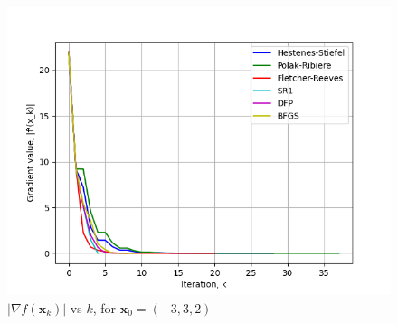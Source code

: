\documentclass[a4paper]{article}
\begin{document}
\begin{figure}[H]
    \centering
    \includegraphics[width=.65\textwidth]{hyperellipsoid_function_grad.png}
    \caption{$|\nabla f(\textbf{x}_k)|$ vs $k$, for $\textbf{x}_0 = (-3, 3, 2)$}
\end{figure}
\end{document}
